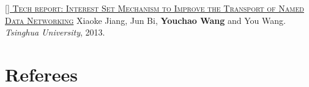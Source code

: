 \documentclass[11pt,a4paper]{moderncv}
\begin{document}
\addtocounter{counter}{1}

\href{http://netarchlab.tsinghua.edu.cn/~shock/THU-NetArchLab-ICN-TR-ISTSET-20130517.pdf}{\textsc{[] Tech report: Interest Set Mechanism to Improve the Transport of Named Data Networking}}
\newline  Xiaoke Jiang, Jun Bi, \textbf{Youchao Wang} and You Wang.\textit{ Tsinghua University}, 2013. 

\addtocounter{counter}{1}

\vspace*{-0.2cm}



\section{Referees}
\end{document}
